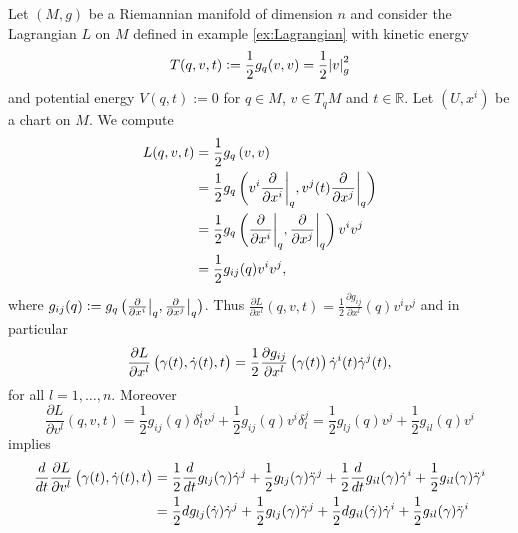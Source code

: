 \begin{example}
	Let $(M,g)$ be a Riemannian manifold of dimension $n$ and consider the Lagrangian $L$ on $M$ defined in example \ref{ex:Lagrangian} with kinetic energy
	\begin{equation*}
		T(q,v,t) := \frac{1}{2}g_q(v,v) = \frac{1}{2}\abs{v}^2_g
	\end{equation*}
	\noindent and potential energy $V(q,t) := 0$ for $q \in M$, $v \in T_qM$ and $t \in \mathbb{R}$. Let $(U,x^i)$ be a chart on $M$. We compute
	\begin{align*}
		L(q,v,t) &= \frac{1}{2}g_{q}\del[0]{v,v}\\
		&= \frac{1}{2}g_{q}\del[3]{v^i\frac{\partial}{\partial x^i}\bigg\vert_q,v^j(t)\frac{\partial}{\partial x^j}\bigg\vert_q}\\
		&= \frac{1}{2}g_{q}\del[3]{\frac{\partial}{\partial x^i}\bigg\vert_q,\frac{\partial}{\partial x^j}\bigg\vert_q}v^iv^j\\
		&= \frac{1}{2}g_{ij}(q)v^iv^j,
	\end{align*}
	\noindent where $g_{ij}(q) := g_{q}\del[1]{\frac{\partial}{\partial x^i}\big\vert_q,\frac{\partial}{\partial x^j}\big\vert_q}$. Thus $\frac{\partial L}{\partial x^l}(q,v,t) = \frac{1}{2}\frac{\partial g_{ij}}{\partial x^l}(q)v^i v^j$ and in particular
	\begin{equation*}
		\frac{\partial L}{\partial x^l}\del[1]{\gamma(t),\dot{\gamma}(t),t} = \frac{1}{2}\frac{\partial g_{ij}}{\partial x^l}\del[1]{\gamma(t)}\dot{\gamma}^i(t) \dot{\gamma}^j(t),
	\end{equation*}
	\noindent for all $l = 1,\dots,n$. Moreover
	\begin{equation*}
		\frac{\partial L}{\partial v^l}(q,v,t) = \frac{1}{2}g_{ij}(q)\delta^i_lv^j + \frac{1}{2}g_{ij}(q)v^i\delta^j_l = \frac{1}{2}g_{lj}(q)v^j + \frac{1}{2}g_{il}(q)v^i
	\end{equation*}
	\noindent implies
	\begin{align*}
		\frac{d}{dt}\frac{\partial L}{\partial v^l}\del[1]{\gamma(t),\dot{\gamma}(t),t} &= \frac{1}{2}\frac{d}{dt}g_{lj}(\gamma)\dot{\gamma}^j + \frac{1}{2}g_{lj}(\gamma)\ddot{\gamma}^j + \frac{1}{2}\frac{d}{dt}g_{il}(\gamma)\dot{\gamma}^i + \frac{1}{2}g_{il}(\gamma)\ddot{\gamma}^i\\
		&= \frac{1}{2}dg_{lj}(\dot{\gamma})\dot{\gamma}^j + \frac{1}{2}g_{lj}(\gamma)\ddot{\gamma}^j + \frac{1}{2}dg_{il}(\dot{\gamma})\dot{\gamma}^i + \frac{1}{2}g_{il}(\gamma)\ddot{\gamma}^i\\

\end{align*}
\end{example}
